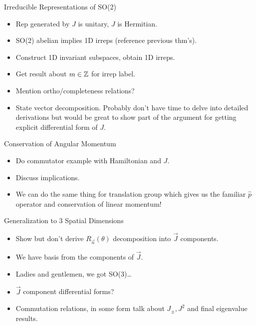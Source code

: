 \documentclass[compress,aspectratio=169,10pt,usenames,dvipsnames]{beamer}
\begin{document}
\begin{frame}{Irreducible Representations of SO(2)}

\begin{itemize}
  \item Rep generated by $J$ is unitary, $J$ is Hermitian.
  \item SO(2) abelian implies 1D irreps (reference previous thm's).
  \item Construct 1D invariant subspaces, obtain 1D irreps.
  \item Get result about $m\in\mathbb{Z}$ for irrep label.
  \item Mention ortho/completeness relations?
  \item State vector decomposition. Probably don't have time to delve into detailed derivations but would be great to show part of the argument for getting explicit differential form of $J$.
\end{itemize}

\end{frame}


\begin{frame}{Conservation of Angular Momentum}

\begin{itemize}
  \item Do commutator example with Hamiltonian and $J$.
  \item Discuss implications.
  \item We can do the same thing for translation group which gives us the familiar $\hat{p}$ operator and conservation of linear momentum!
\end{itemize}

\end{frame}


\begin{frame}{Generalization to 3 Spatial Dimensions}

\begin{itemize}
  \item Show but don't derive $R_{\vec{n}}(\theta)$ decomposition into $\vec{J}$ components.
  \item We have basis from the components of $\vec{J}$.
  \item Ladies and gentlemen, we got SO(3)\dots
  \item $\vec{J}$ component differential forms?
  \item Commutation relations, in some form talk about $J_{\pm},J^2$ and final eigenvalue results.
\end{itemize}

\end{frame}
\end{document}
